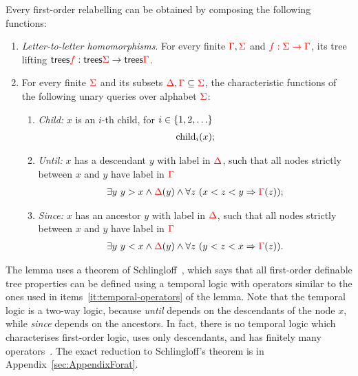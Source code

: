 \begin{lemma}\label{lem:schlingloff} Every first-order relabelling can be obtained by composing the following functions:
    \begin{enumerate}
        \item \label{it:relabelling} \emph{Letter-to-letter homomorphisms}. For  every finite ${\color{red}{\Gamma}},{\color{red}{\Sigma}}$ and ${\color{red}{f : {\color{red}{\Sigma}}\to {\color{red}{\Gamma}}}}$, its tree lifting $\mathsf {trees} {\color{red}{f}} : \mathsf {trees} {\color{red}{\Sigma}} \to \mathsf {trees} {\color{red}{\Gamma}}$.
        \item \label{it:temporal-operators} For every finite  ${\color{red}{\Sigma}}$ and its subsets ${\color{red}{\Delta}}, {\color{red}{\Gamma}} \subseteq {\color{red}{\Sigma}}$, the characteristic functions of the following unary queries over alphabet ${\color{red}{\Sigma}}$:
        \begin{enumerate}
            \item \label{it:child} \emph{Child:} $x$ is an $i$-th child, for $i \in \{1,2,\ldots\}$
            \begin{align*}
            \mathrm{child}_{i} (x); 
            \end{align*}
             \item \label{it:until} \emph{Until:}  $x$ has a descendant $y$ with label in ${\color{red}{\Delta}}$, such that all nodes strictly between $x$ and $y$ have label in ${\color{red}{\Gamma}}$
             \begin{align*} 
                  \exists y\ y > x \land {\color{red}{\Delta}}(y) \land  \forall z \ (x < z < y \Rightarrow {\color{red}{\Gamma}}(z));
             \end{align*} 
             \item \label{it:since}\emph{Since:} $x$ has an ancestor $y$ with label in ${\color{red}{\Delta}}$, such that all nodes strictly between $x$ and $y$ have label in ${\color{red}{\Gamma}}$
             \begin{align*}
                  \exists y\ y < x \land {\color{red}{\Delta}}(y) \land  \forall z \ (y < z < x \Rightarrow {\color{red}{\Gamma}}(z)).
             \end{align*} 
        \end{enumerate}
    \end{enumerate}
    
\end{lemma}

The  lemma uses a theorem of   Schlingloff~\cite[Theorem 2.6]{schlingloff1992expressive}, which says  that all first-order definable tree properties can be defined using a temporal logic with operators similar to the ones used in items~\ref{it:temporal-operators} of the lemma. Note that the temporal logic is a two-way logic, because  \emph{until} depends on the descendants of the node $x$, while \emph{since} depends on the ancestors. In fact, there is no temporal logic which characterises first-order logic, uses only descendants, and has finitely many operators~\cite[Theorem 5.5]{bojanczykWreathProductsForest2012}. 
The exact reduction to Schlingloff's theorem is  in Appendix~\ref{sec:AppendixForat}.

